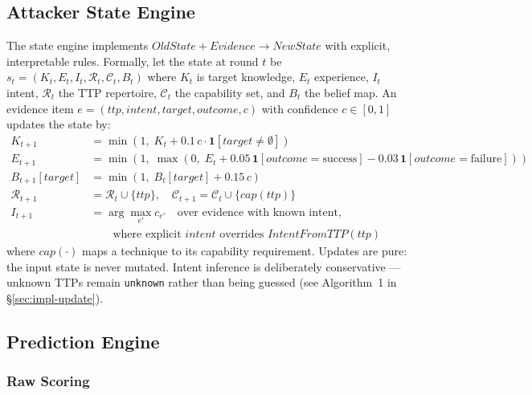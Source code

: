 \documentclass[11pt]{article}
\newcommand{\act}[1]{\texttt{#1}}
\begin{document}
\subsection{Attacker State Engine}
\label{sec:state-engine}

The state engine implements
$\mathit{OldState} + \mathit{Evidence} \to \mathit{NewState}$ with explicit,
interpretable rules. Formally, let the state at round $t$ be
$s_t = (K_t, E_t, I_t, \mathcal{R}_t, \mathcal{C}_t, B_t)$ where $K_t$ is
target knowledge, $E_t$ experience, $I_t$ intent, $\mathcal{R}_t$ the TTP
repertoire, $\mathcal{C}_t$ the capability set, and $B_t$ the belief map.
An evidence item $e = (\mathit{ttp}, \mathit{intent}, \mathit{target},
\mathit{outcome}, c)$ with confidence $c \in [0,1]$ updates the state by:
\begin{align}
K_{t+1} &= \min(1,\; K_t + 0.1\, c \cdot \mathbf{1}[\mathit{target}
\neq \emptyset]) \label{eq:know} \\
E_{t+1} &= \min(1,\; \max(0,\; E_t + 0.05\,\mathbf{1}[\mathit{outcome}
= \text{success}] - 0.03\,\mathbf{1}[\mathit{outcome} = \text{failure}]))
\label{eq:exp} \\
B_{t+1}[\mathit{target}] &= \min(1,\; B_t[\mathit{target}]
+ 0.15\, c) \label{eq:belief} \\
\mathcal{R}_{t+1} &= \mathcal{R}_t \cup \{\mathit{ttp}\},
\quad \mathcal{C}_{t+1} = \mathcal{C}_t \cup \{\mathit{cap}(\mathit{ttp})\}
\label{eq:repertoire} \\
I_{t+1} &= \arg\max_{e'} c_{e'} \quad \text{over evidence with known intent,} \label{eq:intent} \\
&\qquad \text{where explicit $\mathit{intent}$ overrides $\mathit{IntentFromTTP}(\mathit{ttp})$} \nonumber
\end{align}
where $\mathit{cap}(\cdot)$ maps a technique to its capability requirement.
Updates are pure: the input state is never mutated. Intent inference is
deliberately conservative --- unknown TTPs remain \act{unknown} rather than
being guessed (see Algorithm~1 in \S\ref{sec:impl-update}).

\subsection{Prediction Engine}
\label{sec:predictor}

\subsubsection{Raw Scoring}
\label{sec:prediction-formal}
\end{document}
